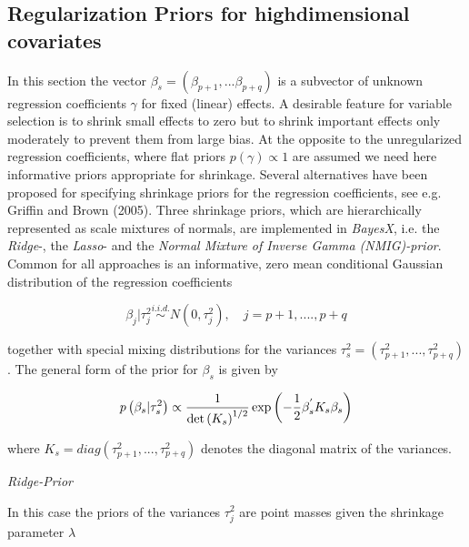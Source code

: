 \documentclass[11pt,a4paper,twoside]{bayesxarticle}
\begin{document}
\subsection{Regularization Priors for highdimensional covariates}
\label{Regularization Priors for highdimensional covariates}

In this section the vector $\beta _{s} =\left(\beta _{p+1} ,...\beta _{p+q} 
\right)$ is a subvector of unknown regression coefficients $\gamma $ for fixed (linear) 
effects. A desirable feature for variable selection is to shrink small effects to 
zero but to shrink important effects only moderately to prevent them from large bias. 
At the opposite to the unregularized regression coefficients, where flat priors $p
\left(\gamma \right)\propto 1$ are assumed we need here informative priors appropriate 
for shrinkage. Several alternatives have been proposed for specifying shrinkage priors 
for the regression coefficients, see e.g. Griffin and Brown (2005). Three 
shrinkage priors, which are hierarchically represented as scale mixtures of normals, 
are implemented in {\em BayesX}, i.e. the {\em Ridge}-, the {\em Lasso}- and the {\em Normal 
Mixture of Inverse Gamma (NMIG)-prior}. Common for all approaches is an informative, 
zero mean conditional Gaussian distribution of the regression coefficients

\[\beta _{j} |\tau _{j}^{2} \mathop{\sim }\limits^{i.i.d.} N\left(0,\tau _{j}^{2} 
\right),\quad j=p+1,....,p+q\]
 
together with special mixing distributions for the variances $\tau _{s}^{2} =\left(
\tau _{p+1}^{2} ,...,\tau _{p+q}^{2} \right)$. The general form of the prior for $\beta 
_{s} $ is given by

\begin{equation} 
\label{ZEqnNum341486} 
p\left(\beta _{s} |\tau _{s}^{2} \right)\propto \frac{1}{\det \left(K_{s} \right)^{{1
\mathord{\left/ {\vphantom {1 2}} \right. \kern-\nulldelimiterspace} 2} } } \exp 
\left(-\frac{1}{2} \beta _{s} ^{{'} } K_{s} \beta _{s} \right) 
\end{equation}
 
where $K_{s} =diag\left(\tau _{p+1}^{2} ,...,\tau _{p+q}^{2} \right)$ denotes the 
diagonal matrix of the variances.

{\em Ridge-Prior}

In this case the priors of the variances $\tau _{j}^{2} $ are point masses 
given the shrinkage parameter $\lambda $
\end{document}
